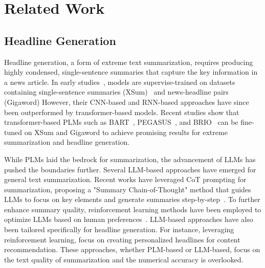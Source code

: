 \section{Related Work}
\subsection{Headline Generation}

Headline generation, a form of extreme text summarization, requires producing highly condensed, single-sentence summaries that capture the key information in a news article. 
In early studies~\citep{rush_neural_2015,narayan_dont_2018}, models are supervise-trained on datasets containing single-sentence summaries (XSum)~\citep{narayan_dont_2018} and news-headline pairs (Gigaword) \citep{rush_neural_2015} However, their CNN-based and RNN-based approaches have since been outperformed by transformer-based models. 
Recent studies show that transformer-based PLMs such as BART~\citep{lewis_bart_2019}, PEGASUS~\citep{zhang_pegasus_2020}, and BRIO~\citep{liu_brio_2022} can be fine-tuned on XSum and Gigaword to achieve promising results for extreme summarization and headline generation. 

While PLMs laid the bedrock for summarization, the advancement of LLMs has pushed the boundaries further. Several LLM-based approaches have emerged for general text summarization. Recent works have leveraged CoT prompting for summarization, proposing a "Summary Chain-of-Thought" method that guides LLMs to focus on key elements and generate summaries step-by-step~\citep{wang_element-aware_2023}. To further enhance summary quality, reinforcement learning methods have been employed to optimize LLMs based on human preferences~\citep{stiennon_learning_2022}. LLM-based approaches have also been tailored specifically for headline generation. For instance, leveraging reinforcement learning, \citet{tan_enhancing_2024} focus on creating personalized headlines for content recommendation. 
These approaches, whether PLM-based or LLM-based, focus on the text quality of summarization and the numerical accuracy is overlooked.


